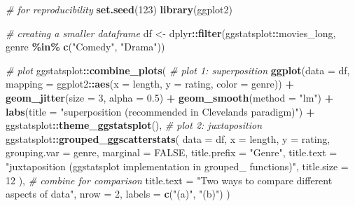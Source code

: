 \documentclass[
]{article}
\newenvironment{Shaded}{\begin{snugshade}}{\end{snugshade}}
\newcommand{\CommentTok}[1]{\textcolor[rgb]{0.56,0.35,0.01}{\textit{#1}}}
\newcommand{\DataTypeTok}[1]{\textcolor[rgb]{0.13,0.29,0.53}{#1}}
\newcommand{\DecValTok}[1]{\textcolor[rgb]{0.00,0.00,0.81}{#1}}
\newcommand{\FloatTok}[1]{\textcolor[rgb]{0.00,0.00,0.81}{#1}}
\newcommand{\KeywordTok}[1]{\textcolor[rgb]{0.13,0.29,0.53}{\textbf{#1}}}
\newcommand{\NormalTok}[1]{#1}
\newcommand{\OperatorTok}[1]{\textcolor[rgb]{0.81,0.36,0.00}{\textbf{#1}}}
\newcommand{\OtherTok}[1]{\textcolor[rgb]{0.56,0.35,0.01}{#1}}
\newcommand{\StringTok}[1]{\textcolor[rgb]{0.31,0.60,0.02}{#1}}
\begin{document}
\begin{Shaded}
\begin{Highlighting}[]
\CommentTok{\# for reproducibility}
\KeywordTok{set.seed}\NormalTok{(}\DecValTok{123}\NormalTok{)}
\KeywordTok{library}\NormalTok{(ggplot2)}

\CommentTok{\# creating a smaller dataframe}
\NormalTok{df <{-}}\StringTok{ }\NormalTok{dplyr}\OperatorTok{::}\KeywordTok{filter}\NormalTok{(ggstatsplot}\OperatorTok{::}\NormalTok{movies\_long, genre }\OperatorTok{\%in\%}\StringTok{ }\KeywordTok{c}\NormalTok{(}\StringTok{"Comedy"}\NormalTok{, }\StringTok{"Drama"}\NormalTok{))}

\CommentTok{\# plot}
\NormalTok{ggstatsplot}\OperatorTok{::}\KeywordTok{combine\_plots}\NormalTok{(}
  \CommentTok{\# plot 1: superposition}
  \KeywordTok{ggplot}\NormalTok{(}\DataTypeTok{data =}\NormalTok{ df, }\DataTypeTok{mapping =}\NormalTok{ ggplot2}\OperatorTok{::}\KeywordTok{aes}\NormalTok{(}\DataTypeTok{x =}\NormalTok{ length, }\DataTypeTok{y =}\NormalTok{ rating, }\DataTypeTok{color =}\NormalTok{ genre)) }\OperatorTok{+}
\StringTok{    }\KeywordTok{geom\_jitter}\NormalTok{(}\DataTypeTok{size =} \DecValTok{3}\NormalTok{, }\DataTypeTok{alpha =} \FloatTok{0.5}\NormalTok{) }\OperatorTok{+}
\StringTok{    }\KeywordTok{geom\_smooth}\NormalTok{(}\DataTypeTok{method =} \StringTok{"lm"}\NormalTok{) }\OperatorTok{+}
\StringTok{    }\KeywordTok{labs}\NormalTok{(}\DataTypeTok{title =} \StringTok{"superposition (recommended in Cleveland\textquotesingle{}s paradigm)"}\NormalTok{) }\OperatorTok{+}
\StringTok{    }\NormalTok{ggstatsplot}\OperatorTok{::}\KeywordTok{theme\_ggstatsplot}\NormalTok{(),}
  \CommentTok{\# plot 2: juxtaposition}
\NormalTok{  ggstatsplot}\OperatorTok{::}\KeywordTok{grouped\_ggscatterstats}\NormalTok{(}
    \DataTypeTok{data =}\NormalTok{ df,}
    \DataTypeTok{x =}\NormalTok{ length,}
    \DataTypeTok{y =}\NormalTok{ rating,}
    \DataTypeTok{grouping.var =}\NormalTok{ genre,}
    \DataTypeTok{marginal =} \OtherTok{FALSE}\NormalTok{,}
    \DataTypeTok{title.prefix =} \StringTok{"Genre"}\NormalTok{,}
    \DataTypeTok{title.text =} \StringTok{"juxtaposition (\textasciigrave{}ggstatsplot\textasciigrave{} implementation in \textasciigrave{}grouped\_\textasciigrave{} functions)"}\NormalTok{,}
    \DataTypeTok{title.size =} \DecValTok{12}
\NormalTok{  ),}
  \CommentTok{\# combine for comparison}
  \DataTypeTok{title.text =} \StringTok{"Two ways to compare different aspects of data"}\NormalTok{,}
  \DataTypeTok{nrow =} \DecValTok{2}\NormalTok{,}
  \DataTypeTok{labels =} \KeywordTok{c}\NormalTok{(}\StringTok{"(a)"}\NormalTok{, }\StringTok{"(b)"}\NormalTok{)}
\NormalTok{)}
\end{Highlighting}
\end{Shaded}
\end{document}
